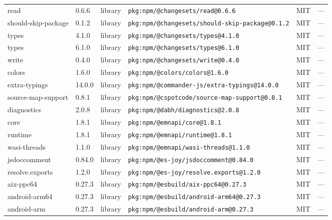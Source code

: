 \documentclass[11pt,a4paper]{article}
\begin{document}
\begin{longtable}{|p{4cm}|p{2cm}|p{1.6cm}|p{5cm}|p{1.5cm}|p{3.5cm}|}
\raggedright read & 0.6.6 & library & \small\texttt{pkg:npm/@changesets/read@0.6.6} & MIT & \small — \\
\raggedright should-skip-package & 0.1.2 & library & \small\texttt{pkg:npm/@changesets/should-skip-package@0.1.2} & MIT & \small — \\
\raggedright types & 4.1.0 & library & \small\texttt{pkg:npm/@changesets/types@4.1.0} & MIT & \small — \\
\raggedright types & 6.1.0 & library & \small\texttt{pkg:npm/@changesets/types@6.1.0} & MIT & \small — \\
\raggedright write & 0.4.0 & library & \small\texttt{pkg:npm/@changesets/write@0.4.0} & MIT & \small — \\
\raggedright colors & 1.6.0 & library & \small\texttt{pkg:npm/@colors/colors@1.6.0} & MIT & \small — \\
\raggedright extra-typings & 14.0.0 & library & \small\texttt{pkg:npm/@commander-js/extra-typings@14.0.0} & MIT & \small — \\
\raggedright source-map-support & 0.8.1 & library & \small\texttt{pkg:npm/@cspotcode/source-map-support@0.8.1} & MIT & \small — \\
\raggedright diagnostics & 2.0.8 & library & \small\texttt{pkg:npm/@dabh/diagnostics@2.0.8} & MIT & \small — \\
\raggedright core & 1.8.1 & library & \small\texttt{pkg:npm/@emnapi/core@1.8.1} & MIT & \small — \\
\raggedright runtime & 1.8.1 & library & \small\texttt{pkg:npm/@emnapi/runtime@1.8.1} & MIT & \small — \\
\raggedright wasi-threads & 1.1.0 & library & \small\texttt{pkg:npm/@emnapi/wasi-threads@1.1.0} & MIT & \small — \\
\raggedright jsdoccomment & 0.84.0 & library & \small\texttt{pkg:npm/@es-joy/jsdoccomment@0.84.0} & MIT & \small — \\
\raggedright resolve.exports & 1.2.0 & library & \small\texttt{pkg:npm/@es-joy/resolve.exports@1.2.0} & MIT & \small — \\
\raggedright aix-ppc64 & 0.27.3 & library & \small\texttt{pkg:npm/@esbuild/aix-ppc64@0.27.3} & MIT & \small — \\
\raggedright android-arm64 & 0.27.3 & library & \small\texttt{pkg:npm/@esbuild/android-arm64@0.27.3} & MIT & \small — \\
\raggedright android-arm & 0.27.3 & library & \small\texttt{pkg:npm/@esbuild/android-arm@0.27.3} & MIT & \small — \\

\end{longtable}
\end{document}
